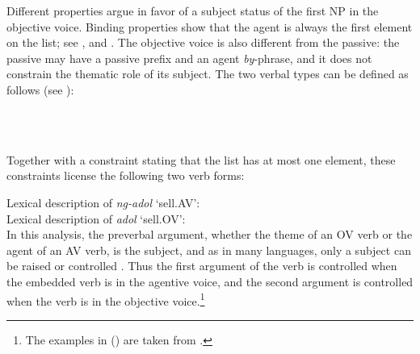 Different properties argue in favor of a subject status of the first NP in the objective
voice. Binding properties show that the agent is always the first element on the \argst list; see
,  and . The objective
voice is also different from the passive: the passive may have a passive prefix and an agent
\emph{by}-phrase, and it does not constrain the thematic role of its subject. The two verbal types can
be defined as follows (see ):

\eal
\ex 
{} \impl\\
\ex 
{} \impl\\
\zl

Together with a constraint stating that the \subj list has at most one element, these constraints license the following two verb forms:

\eal
\ex 
Lexical description of \emph{ng-adol} `sell.AV':\\
\ex 
Lexical description of \emph{adol} `sell.OV':\\
\zl
In this analysis, the preverbal argument, whether the theme of an OV verb or the agent of an AV
verb, is the subject, and as in many languages, only a subject can be raised or controlled
\citep{Chomsky1981,Zaenenetal1985}. Thus the first argument of the verb is controlled when the embedded verb is
in the agentive voice, and the second argument
is controlled when the verb is in the objective
voice.\footnote{%
  The examples in () are taken from .
}


